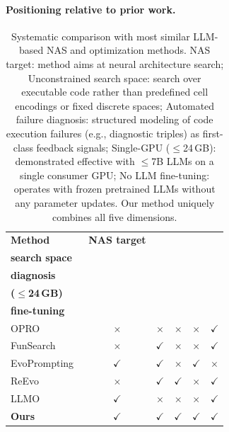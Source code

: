 \documentclass[10pt,twocolumn,letterpaper]{article}
\begin{document}
	\paragraph{Positioning relative to prior work.}
	\begin{table}[t]
	\centering
	\fontsize{7.5}{9}\selectfont
	\begin{tabular}{l c c c c c}
	\toprule
	\textbf{Method} & \textbf{NAS target} & \makecell{\textbf{Unconstrained}\\\textbf{search space}} & \makecell{\textbf{Automated failure}\\\textbf{diagnosis}} & \makecell{\textbf{Single-GPU}\\\textbf{($\leq$24\,GB)}} & \makecell{\textbf{No LLM}\\\textbf{fine-tuning}} \\
	\midrule
	OPRO~\cite{Yang2023OPRO} & $\times$ & $\times$ & $\times$ & $\times$ & $\checkmark$ \\
	FunSearch~\cite{Romera2023FunSearch} & $\times$ & $\checkmark$ & $\times$ & $\times$ & $\checkmark$ \\
	EvoPrompting~\cite{Chen2023EvoPrompting} & $\checkmark$ & $\checkmark$ & $\times$ & $\checkmark$ & $\times$ \\
	ReEvo~\cite{Ye2024ReEvo} & $\times$ & $\checkmark$ & $\checkmark$ & $\times$ & $\checkmark$ \\
	LLMO~\cite{Zhong2024LLMO} & $\checkmark$ & $\times$ & $\times$ & $\times$ & $\checkmark$ \\
	\midrule
	\textbf{Ours} & $\checkmark$ & $\checkmark$ & $\checkmark$ & $\checkmark$ & $\checkmark$ \\
	\bottomrule
	\end{tabular}
	\caption{Systematic comparison with most similar LLM-based NAS and optimization methods.
	NAS target: method aims at neural architecture search;
	Unconstrained search space: search over executable code rather than predefined cell encodings or fixed discrete spaces;
	Automated failure diagnosis: structured modeling of code execution failures (e.g., diagnostic triples) as first-class feedback signals;
	Single-GPU ($\leq$24\,GB): demonstrated effective with $\leq$7B LLMs on a single consumer GPU;
	No LLM fine-tuning: operates with frozen pretrained LLMs without any parameter updates.
	Our method uniquely combines all five dimensions.}
	\label{table:comparison}
	\end{table}
\end{document}
